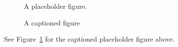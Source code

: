 \documentclass{article}
\begin{document}
\begin{figure}
\centering A placeholder figure.
\capstart\caption{A captioned figure}\label{fig:h}
\end{figure}
See Figure~\ref{fig:h} for the captioned placeholder figure above.
\end{document}
